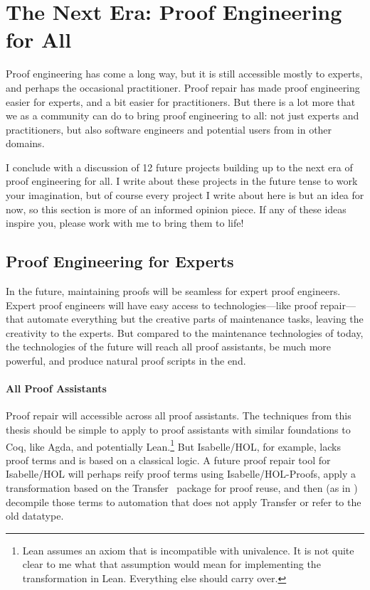 \section*{The Next Era: Proof Engineering for All}


Proof engineering has come a long way, but it is still accessible mostly to experts, and perhaps the occasional practitioner.
Proof repair has made proof engineering easier for experts, and a bit easier for practitioners.
But there is a lot more that we as a community can do to bring proof engineering to all: not just experts and practitioners,
but also software engineers and potential users from in other domains.

I conclude with a discussion of 12 future projects building up to the next era of proof engineering for all.
I write about these projects in the future tense to work your imagination, but of course every project I write about here is but an idea for now,
so this section is more of an informed opinion piece.
If any of these ideas inspire you, please work with me to bring them to life!

\subsection*{Proof Engineering for Experts}

In the future, maintaining proofs will be seamless for expert proof engineers.
Expert proof engineers will have easy access to technologies---like proof repair---that automate everything but the creative parts of maintenance tasks,
leaving the creativity to the experts.
But compared to the maintenance technologies of today, the technologies of the future will reach all proof assistants,
be much more powerful,
and produce natural proof scripts in the end.

\paragraph{All Proof Assistants}
Proof repair will accessible across all proof assistants.
The techniques from this thesis should be simple to apply to proof assistants with similar foundations to Coq, like Agda,
and potentially Lean.\footnote{Lean assumes an axiom that is incompatible with univalence.
It is not quite clear to me what that assumption would mean for implementing the \toolnamec transformation in Lean.
Everything else should carry over.}
But Isabelle/HOL, for example, lacks proof terms and is based on a classical logic.
A future proof repair tool for Isabelle/HOL will perhaps reify proof terms using
Isabelle/HOL-Proofs, apply a transformation based on the Transfer~\cite{Huffman2013} package for proof reuse, and then (as in \toolnamec) decompile those terms to automation that does 
not apply Transfer or refer to the old datatype.

